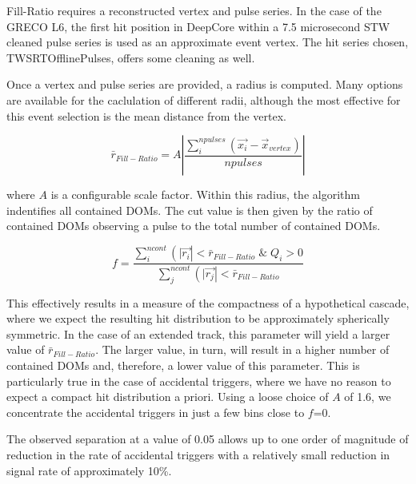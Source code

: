 Fill-Ratio requires a reconstructed vertex and pulse series.
In the case of the GRECO L6, the first hit position in DeepCore within a 7.5 microsecond STW cleaned pulse series is used as an approximate event vertex.
The hit series chosen, TWSRTOfflinePulses, offers some cleaning as well.

Once a vertex and pulse series are provided, a radius is computed.
Many options are available for the caclulation of different radii, although the most effective for this event selection is the mean distance from the vertex.

\begin{equation}
	\bar{r}_{Fill-Ratio} = A \left|\frac{\sum_i^{npulses} \left(\vec{x_i}-\vec{x}_{vertex}\right)}{npulses}\right|
\end{equation}

where $A$ is a configurable scale factor. 
Within this radius, the algorithm indentifies all contained DOMs.
The cut value is then given by the ratio of contained DOMs observing a pulse to the total number of contained DOMs.

\begin{equation}
	f = \frac{\sum_i^{ncont} \left(|\vec{r_i}\right|<\bar{r}_{Fill-Ratio} \;\&\; Q_i>0}{\sum_j^{ncont} \left(|\vec{r_j}\right|<\bar{r}_{Fill-Ratio}}
\end{equation}

This effectively results in a measure of the compactness of a hypothetical cascade, where we expect the resulting hit distribution to be approximately spherically symmetric.
In the case of an extended track, this parameter will yield a larger value of $\bar{r}_{Fill-Ratio}$.
The larger value, in turn, will result in a higher number of contained DOMs and, therefore, a lower value of this parameter.
This is particularly true in the case of accidental triggers, where we have no reason to expect a compact hit distribution a priori.
Using a loose choice of $A$ of 1.6, we concentrate the accidental triggers in just a few bins close to $f$=0.

The observed separation at a value of 0.05 allows up to one order of magnitude of reduction in the rate of accidental triggers with a relatively small reduction in signal rate of approximately 10\%.


